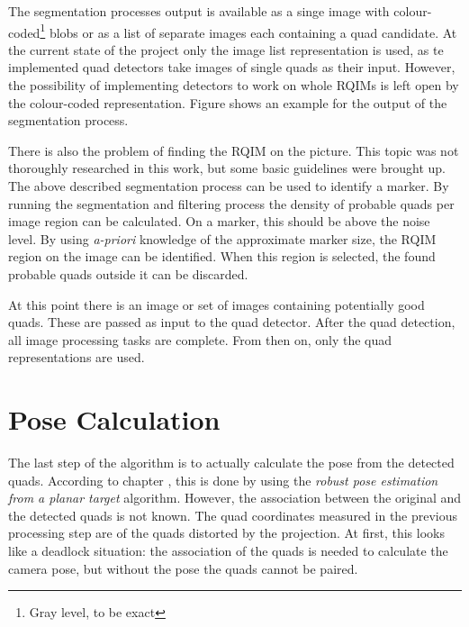 The segmentation processes output is available as a singe image with colour-coded\footnote{Gray level, to be exact} blobs or as a list of separate images each containing a quad candidate.
At the current state of the project only the image list representation is used, as te implemented quad detectors take images of single quads as their input.
However, the possibility of implementing detectors to work on whole RQIMs is left open by the colour-coded representation.
Figure  shows an example for the output of the segmentation process.

There is also the problem of finding the RQIM on the picture.
This topic was not thoroughly researched in this work, but some basic guidelines were brought up.
The above described segmentation process can be used to identify a marker.
By running the segmentation and filtering process the density of probable quads per image region can be calculated.
On a marker, this should be above the noise level.
By using \textit{a-priori} knowledge of the approximate marker size, the RQIM region on the image can be identified.
When this region is selected, the found probable quads outside it can be discarded.

At this point there is an image or set of images containing potentially good quads.
These are passed as input to the quad detector.
After the quad detection, all image processing tasks are complete.
From then on, only the quad representations are used.

\section{Pose Calculation}

The last step of the algorithm is to actually calculate the pose from the detected quads.
According to chapter , this is done by using the \textit{robust pose estimation from a planar target} algorithm.
However, the association between the original and the detected quads is not known.
The quad coordinates measured in the previous processing step are of the quads distorted by the projection.
At first, this looks like a deadlock situation: the association of the quads is needed to calculate the camera pose, but without the pose the quads cannot be paired.

